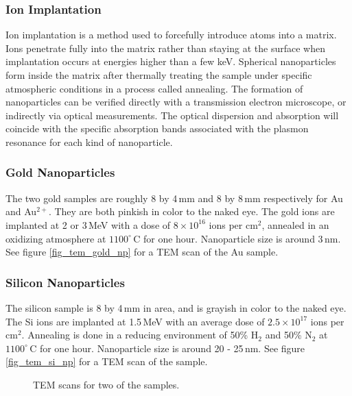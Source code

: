 \subsubsection{Ion Implantation}
Ion implantation is a method used to forcefully introduce atoms into a matrix. Ions penetrate fully into the matrix rather than staying at the surface when implantation occurs at energies higher than a few keV. Spherical nanoparticles form inside the matrix after thermally treating the sample under specific atmospheric conditions in a process called annealing. The formation of nanoparticles can be verified directly with a transmission electron microscope, or indirectly via optical measurements. The optical dispersion and absorption will coincide with the specific absorption bands associated with the plasmon resonance for each kind of nanoparticle.

\subsubsection{Gold Nanoparticles}\label{chap_setup_gold}
The two gold samples are roughly 8 by 4\,mm and 8 by 8\,mm respectively for Au and Au$^{2+}$. They are both pinkish in color to the naked eye. The gold ions are implanted at 2 or 3\,MeV with a dose of $8\times10^{16}$ ions per $\text{cm}^{2}$, annealed in an oxidizing atmosphere at $1100^{\circ}\,\text{C}$ for one hour. Nanoparticle size is around 3\,nm. See figure \ref{fig_tem_gold_np} for a TEM scan of the Au sample.

\subsubsection{Silicon Nanoparticles}
The silicon sample is 8 by 4\,mm in area, and is grayish in color to the naked eye. The Si ions are implanted at 1.5\,MeV with an average dose of $2.5\times10^{17}$ ions per $\text{cm}^{2}$. Annealing is done in a reducing environment of 50\% $\text{H}_{2}$ and 50\% $\text{N}_{2}$ at $1100^{\circ}\,\text{C}$ for one hour. Nanoparticle size is around 20 - 25\,nm. See figure \ref{fig_tem_si_np} for a TEM scan of the sample.

\begin{figure}[h]
\centering
{}
\caption{TEM scans for two of the samples.}
\end{figure}

